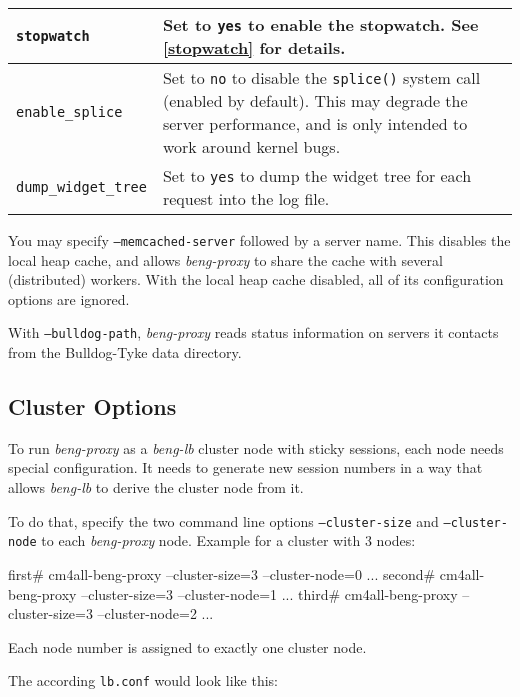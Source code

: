 \documentclass[a4paper,12pt]{article}
\begin{document}
\begin{longtable}{|l|p{8cm}|}
\hline

\verb|stopwatch| & Set to \texttt{yes} to enable the stopwatch.  See
\ref{stopwatch} for details. \\

\hline

\verb|enable_splice| & Set to \texttt{no} to disable the
\texttt{splice()} system call (enabled by default).  This may degrade
the server performance, and is only intended to work around kernel
bugs. \\

\hline

\verb|dump_widget_tree| & Set to \texttt{yes} to dump the widget
tree for each request into the log file. \\

\hline
\end{longtable}

\label{memcached}
You may specify \texttt{--memcached-server} followed by a server name.
This disables the local heap cache, and allows \emph{beng-proxy} to
share the cache with several (distributed) workers.  With the local
heap cache disabled, all of its configuration options are ignored.

\label{bulldog}
With \texttt{--bulldog-path}, \emph{beng-proxy} reads status
information on servers it contacts from the Bulldog-Tyke data
directory.

\subsection{Cluster Options}

To run \emph{beng-proxy} as a \emph{beng-lb} cluster node with sticky
sessions, each node needs special configuration.  It needs to generate
new session numbers in a way that allows \emph{beng-lb} to derive the
cluster node from it.

To do that, specify the two command line options
\texttt{--cluster-size} and \texttt{--cluster-node} to each
\emph{beng-proxy} node.  Example for a cluster with 3 nodes:

\begin{verbatim*}
first# cm4all-beng-proxy --cluster-size=3 --cluster-node=0 ...
second# cm4all-beng-proxy --cluster-size=3 --cluster-node=1 ...
third# cm4all-beng-proxy --cluster-size=3 --cluster-node=2 ...
\end{verbatim*}

Each node number is assigned to exactly one cluster node.

The according \texttt{lb.conf} would look like this:
\end{document}

